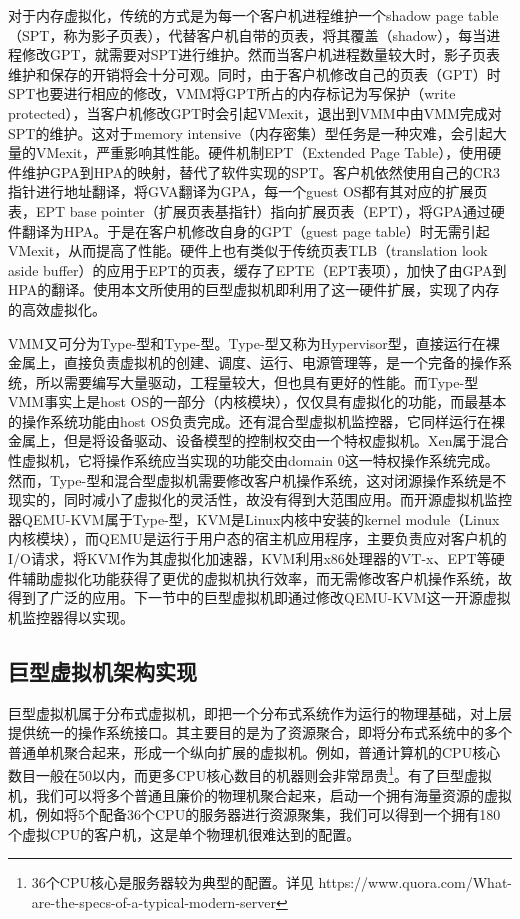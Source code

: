 对于内存虚拟化，传统的方式是为每一个客户机进程维护一个shadow page table（SPT，称为影子页表），代替客户机自带的页表，将其覆盖（shadow），每当进程修改GPT，就需要对SPT进行维护。然而当客户机进程数量较大时，影子页表维护和保存的开销将会十分可观。同时，由于客户机修改自己的页表（GPT）时SPT也要进行相应的修改，VMM将GPT所占的内存标记为写保护（write protected），当客户机修改GPT时会引起VMexit，退出到VMM中由VMM完成对SPT的维护。这对于memory intensive（内存密集）型任务是一种灾难，会引起大量的VMexit，严重影响其性能。硬件机制EPT（Extended Page Table），使用硬件维护GPA到HPA的映射，替代了软件实现的SPT。客户机依然使用自己的CR3指针进行地址翻译，将GVA翻译为GPA，每一个guest OS都有其对应的扩展页表，EPT base pointer（扩展页表基指针）指向扩展页表（EPT），将GPA通过硬件翻译为HPA。于是在客户机修改自身的GPT（guest page table）时无需引起VMexit，从而提高了性能。硬件上也有类似于传统页表TLB（translation look aside buffer）的应用于EPT的页表，缓存了EPTE（EPT表项），加快了由GPA到HPA的翻译。使用本文所使用的巨型虚拟机即利用了这一硬件扩展，实现了内存的高效虚拟化。

VMM又可分为Type-\uppercase\expandafter{}型和Type-\uppercase\expandafter{}型。Type-\uppercase\expandafter{}型又称为Hypervisor型，直接运行在裸金属上，直接负责虚拟机的创建、调度、运行、电源管理等，是一个完备的操作系统，所以需要编写大量驱动，工程量较大，但也具有更好的性能。而Type-\uppercase\expandafter{}型VMM事实上是host OS的一部分（内核模块），仅仅具有虚拟化的功能，而最基本的操作系统功能由host OS负责完成。还有混合型虚拟机监控器，它同样运行在裸金属上，但是将设备驱动、设备模型的控制权交由一个特权虚拟机。Xen属于混合性虚拟机，它将操作系统应当实现的功能交由domain 0这一特权操作系统完成。然而，Type-\uppercase\expandafter{}型和混合型虚拟机需要修改客户机操作系统，这对闭源操作系统是不现实的，同时减小了虚拟化的灵活性，故没有得到大范围应用。而开源虚拟机监控器QEMU-KVM属于Type-\uppercase\expandafter{}型，KVM\cite{KVM}是Linux内核中安装的kernel module（Linux内核模块），而QEMU\cite{QEMU}是运行于用户态的宿主机应用程序，主要负责应对客户机的I/O请求，将KVM作为其虚拟化加速器，KVM利用x86处理器的VT-x、EPT等硬件辅助虚拟化功能获得了更优的虚拟机执行效率，而无需修改客户机操作系统，故得到了广泛的应用。下一节中的巨型虚拟机即通过修改QEMU-KVM这一开源虚拟机监控器得以实现。
\subsection{巨型虚拟机架构实现}
巨型虚拟机属于分布式虚拟机，即把一个分布式系统作为运行的物理基础，对上层提供统一的操作系统接口。其主要目的是为了资源聚合，即将分布式系统中的多个普通单机聚合起来，形成一个纵向扩展的虚拟机。例如，普通计算机的CPU核心数目一般在50以内，而更多CPU核心数目的机器则会非常昂贵\footnote{36个CPU核心是服务器较为典型的配置。详见 https://www.quora.com/What-are-the-specs-of-a-typical-modern-server}。有了巨型虚拟机，我们可以将多个普通且廉价的物理机聚合起来，启动一个拥有海量资源的虚拟机，例如将5个配备36个CPU的服务器进行资源聚集，我们可以得到一个拥有180个虚拟CPU的客户机，这是单个物理机很难达到的配置。

